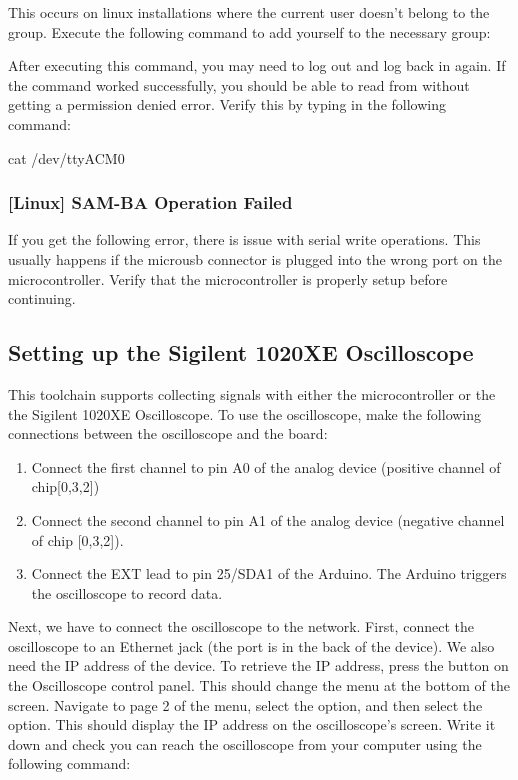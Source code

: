This occurs on linux installations where the current user doesn't belong to the
 group. Execute the following command to add yourself to the
necessary group:


After executing this command, you may need to log out and log back in again. If
the command worked successfully, you should be able to read from
 without getting a permission denied error. Verify this by
typing in the following command:

\begin{snippet}
cat /dev/ttyACM0
\end{snippet}

\subsubsection{[Linux] SAM-BA Operation Failed}

If you get the following error, there is issue with serial write operations.
This usually happens if the microusb connector is plugged into the wrong port
on the microcontroller. Verify that the microcontroller is properly setup
before continuing.

\subsection{Setting up the Sigilent 1020XE Oscilloscope}\label{sec:setup-osc}

This toolchain supports collecting signals with either the microcontroller or
the the Sigilent 1020XE Oscilloscope. To use the oscilloscope, make the following connections
between the oscilloscope and the board:

\begin{enumerate}
  \item Connect the first channel to pin A0 of the analog device (positive channel of
    chip[0,3,2])
  \item Connect the second channel to pin A1 of the analog device (negative channel of chip
    [0,3,2]).
  \item Connect the EXT lead to pin 25/SDA1 of the Arduino. The Arduino triggers the
    oscilloscope to record data.
\end{enumerate}

Next, we have to connect the oscilloscope to the network. First, connect the
oscilloscope to an Ethernet jack (the port is in the back of the device). We
also need the IP address of the device. To retrieve the IP address, press the
 button on the Oscilloscope control panel. This should change the
menu at the bottom of the screen. Navigate to page 2 of the menu, select the
 option, and then select the  option. This should display
the IP address on the oscilloscope's screen. Write it down and check you can
reach the oscilloscope from your computer using the following command:


